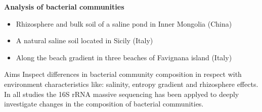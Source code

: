 \documentclass[10pt]{beamer}
\begin{document}
\begin{frame}
	\textbf{\Large{Analysis of bacterial communities}}
	\vspace{5mm}
	\begin{itemize}
		\item Rhizosphere and bulk soil of a saline pond in Inner Mongolia (China)
		\item A natural saline soil located in Sicily (Italy)
		\item Along the beach gradient in three beaches of Favignana island (Italy)
	\end{itemize}
	\vspace{3mm}
	\begin{block}{Aims}
		Inspect differences in bacterial community composition in respect with environment characteristics like: salinity, entropy gradient and rhizosphere effects. In all studies the 16S rRNA massive sequencing has been applyed to deeply investigate changes in the composition of bacterial communities.
	\end{block}
\end{frame}
\end{document}
